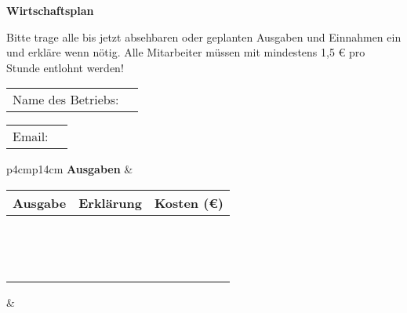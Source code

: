 \documentclass[12pt]{article}
\begin{document}
\textbf{\LARGE{Wirtschaftsplan}}

\vspace{0.5cm}

Bitte trage alle bis jetzt absehbaren oder geplanten Ausgaben und Einnahmen ein und erkläre
wenn nötig. Alle Mitarbeiter müssen mit mindestens 1,5 \euro{} pro Stunde entlohnt werden!

\renewcommand{\arraystretch}{1.5}

\vspace{0.7cm}

\begin{tabular}{p{4cm}p{14cm}}
    Name des Betriebs: & \dotfill \\
\end{tabular}

\vspace{3mm}
\begin{tabular}{p{4cm}p{14cm}}
    Email: & \dotfill \\
\end{tabular}

\vspace{3mm}
\begin{tabular}{p{4cm}p{14cm}}
    \textbf{Ausgaben} & \\[2mm]
    \begin{tabular}{|p{}|p{}|p{}|}
        \hline
        \textbf{Ausgabe} & \textbf{Erklärung} & \textbf{Kosten (\euro)} \\ \hline
        & & \\ \hline
        & & \\ \hline
        & & \\ \hline
        & & \\ \hline
        & & \\ \hline
        & & \\ \hline
        & & \\ \hline
        & & \\ \hline
        & & \\ \hline
        & & \\ \hline
        & & \\ \hline
        & & \\ \hline
        & & \\ \hline
        & & \\ \hline
    \end{tabular} & \\
\end{tabular}
\end{document}
